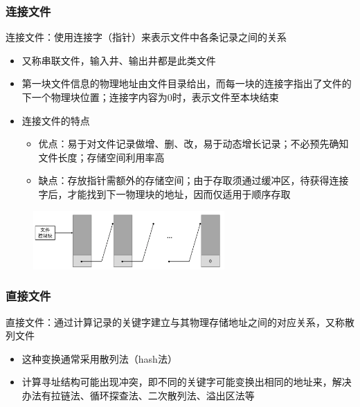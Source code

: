 \documentclass[cs4size,a4paper,10pt]{ctexart}
\begin{document}
	\subsubsection{连接文件}
	连接文件：使用连接字（指针）来表示文件中各条记录之间的关系
	\begin{itemize}
		\item 又称串联文件，输入井、输出井都是此类文件
		\item 第一块文件信息的物理地址由文件目录给出，而每一块的连接字指出了文件的下一个物理块位置；连接字内容为0时，表示文件至本块结束
		\item 连接文件的特点
		\begin{itemize}
			\item 优点：易于对文件记录做增、删、改，易于动态增长记录；不必预先确知文件长度；存储空间利用率高
			\item 缺点：存放指针需额外的存储空间；由于存取须通过缓冲区，待获得连接字后，才能找到下一物理块的地址，因而仅适用于顺序存取
		\end{itemize}
	\end{itemize}

	\begin{figure}[H]
		\centering
		\includegraphics[width=0.65\textwidth]{img/5.2.4.2}
	\end{figure}


	\subsubsection{直接文件}
	直接文件：通过计算记录的关键字建立与其物理存储地址之间的对应关系，又称散列文件
	\begin{itemize}
		\item 这种变换通常采用散列法（hash法）
		\item 计算寻址结构可能出现冲突，即不同的关键字可能变换出相同的地址来，解决办法有拉链法、循环探查法、二次散列法、溢出区法等
	\end{itemize}
\end{document}
